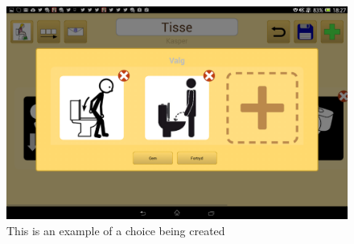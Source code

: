 \begin{figure} [h!]
\centering
\includegraphics[width=.9\textwidth]{Pics/Sprint3/choices/choiceDialog}
\caption{This is an example of a choice being created}
\label{fig:choiceDialog}
\end{figure}
